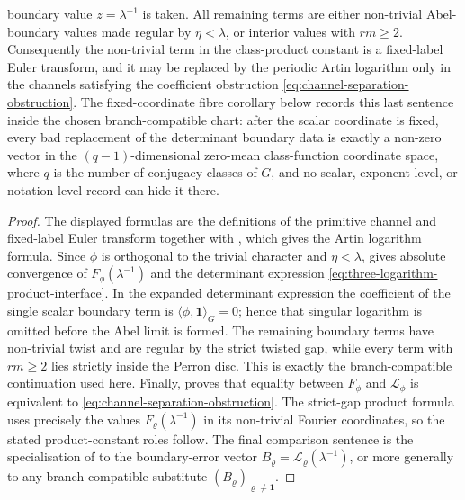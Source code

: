 \begin{proposition}
  boundary value \(z=\lambda^{-1}\) is taken.  All remaining terms are either
  non-trivial Abel-boundary values made regular by \(\eta<\lambda\), or
  interior values with \(rm\ge2\).
  Consequently the non-trivial term in the class-product constant is a
  fixed-label Euler transform, and it may be replaced by the periodic
  Artin logarithm only in the channels satisfying the coefficient
  obstruction \eqref{eq:channel-separation-obstruction}.
  The fixed-coordinate fibre corollary
   below records this
  last sentence inside the chosen branch-compatible chart: after the
  scalar coordinate is fixed, every bad replacement of the determinant
  boundary data is exactly a non-zero vector in the \((q-1)\)-dimensional
  zero-mean class-function coordinate space, where \(q\) is the number of
  conjugacy classes of \(G\), and no scalar, exponent-level, or
  notation-level record can hide it there.
\end{proposition}

\begin{proof}
  The displayed formulas are the definitions of the primitive channel and
  fixed-label Euler transform together with
  , which gives the Artin
  logarithm formula.  Since \(\phi\) is orthogonal to the trivial character
  and \(\eta<\lambda\),  gives
  absolute convergence of \(F_\phi(\lambda^{-1})\) and the determinant
  expression \eqref{eq:three-logarithm-product-interface}.  In the expanded
  determinant expression the coefficient of the single scalar boundary term is
  \(\langle\phi,\mathbf1\rangle_G=0\); hence that singular logarithm is omitted
  before the Abel limit is formed.  The remaining boundary terms have
  non-trivial twist and are regular by the strict twisted gap, while every
  term with \(rm\ge2\) lies strictly inside the Perron disc.  This is exactly
  the branch-compatible continuation used here.
  Finally,  proves that equality
  between \(F_\phi\) and \(\mathcal L_\phi\) is equivalent to
  \eqref{eq:channel-separation-obstruction}.  The strict-gap product formula uses
  precisely the values \(F_\varrho(\lambda^{-1})\) in its non-trivial
  Fourier coordinates, so the stated product-constant roles follow.  The
  final comparison sentence is the specialisation of
   to the boundary-error
  vector
  \(B_\varrho=\mathcal L_\varrho(\lambda^{-1})\), or more generally to any
  branch-compatible substitute \((B_\varrho)_{\varrho\ne\mathbf1}\).
\end{proof}

